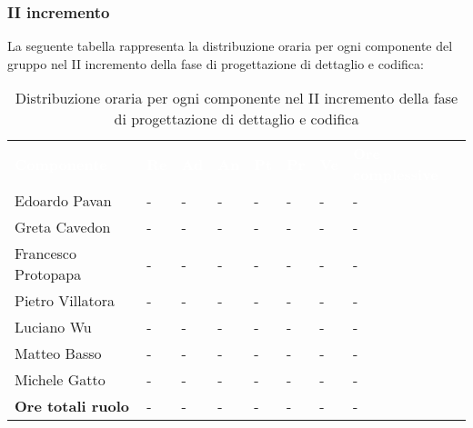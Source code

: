 \subsubsection{II incremento}
La seguente tabella rappresenta la distribuzione oraria per ogni componente del gruppo nel II incremento della fase di progettazione di dettaglio e codifica:
\begin{table}[!htbp]
\begin{center}
\renewcommand{\arraystretch}{1.25}
\begin{tabular}{ m{}<{\centering}  m{}<{\centering} m{}<{\centering} m{}<{\centering}  m{}<{\centering}  m{}<{\centering}  m{}<{\centering}  m{}<{\centering}   }
	\rowcolor{darkblue}
	\textcolor{white}{\textbf{Componente}} &\textcolor{white}{\textbf{Re}}&\textcolor{white}{\textbf{Ad}}&\textcolor{white}{\textbf{An}}&\textcolor{white}{\textbf{Pt}}&\textcolor{white}{\textbf{Pr}}&\textcolor{white}{\textbf{Ve}}&\textcolor{white}{\textbf{Ore complessive}}\\ 

	Edoardo Pavan & - & - & - & - & - & - & -\\	

	\rowcolor{gray!10} Greta Cavedon & - & - & - & - & - & - & -\\
	
	Francesco Protopapa & - & - & - & - & - & - & -\\
	
	\rowcolor{gray!10} Pietro Villatora & - & - & - & - & - & - & -\\
	
	Luciano Wu & - & - & - & - & - & - & -\\
	
	\rowcolor{gray!10} Matteo Basso & - & - & - & - & - & - & -\\
	
	Michele Gatto & - & - & - & - & - & - & -\\
	
	\rowcolor{gray!10} \textbf{Ore totali ruolo} & - & - & - & - & - & - & -\\

\end{tabular}
\caption{Distribuzione oraria per ogni componente nel II incremento della fase di progettazione di dettaglio e codifica}
\end{center}
\end{table}

